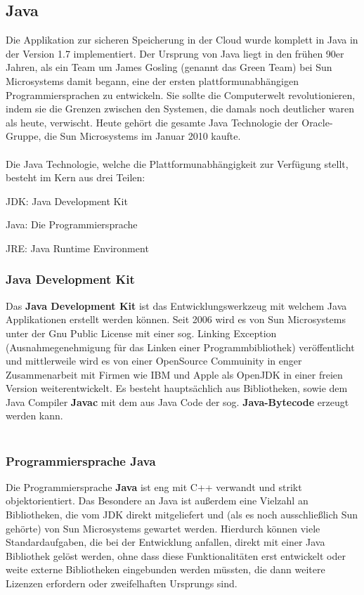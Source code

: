 \documentclass[13pt,a4paper,bibliography=totocnumbered,listof=totocnumbered]{scrartcl}
\begin{document}
\subsection{Java}\label{JavaV}
Die Applikation zur sicheren Speicherung in der Cloud wurde komplett in Java in der Version 1.7 implementiert. Der Ursprung von Java liegt in den frühen 90er Jahren, als ein Team um James Gosling (genannt das Green Team) bei Sun Microsystems damit begann, eine der ersten plattformunabhängigen Programmiersprachen zu entwickeln. Sie sollte die Computerwelt revolutionieren, indem sie die Grenzen zwischen den Systemen, die damals noch deutlicher waren als heute, verwischt. Heute gehört die gesamte Java Technologie der Oracle-Gruppe, die Sun Microsystems im Januar 2010 kaufte.\\
\cite{1}\cite{2}\cite[S. 52]{3}\\

Die Java Technologie, welche die Plattformunabhängigkeit zur Verfügung stellt, besteht im Kern aus drei Teilen:
\begin{compactitem}
	\item JDK: Java Development Kit
	\item Java: Die Programmiersprache
	\item JRE: Java Runtime Environment
\end{compactitem}

\subsubsection{Java Development Kit}
Das \textbf{Java Development Kit} ist das Entwicklungswerkzeug mit welchem Java Applikationen erstellt werden können. Seit 2006 wird es von Sun Microsystems unter der Gnu Public License mit einer sog. Linking Exception (Ausnahmegenehmigung für das Linken einer Programmbibliothek) veröffentlicht und mittlerweile wird es von einer OpenSource Commuinity in enger Zusammenarbeit mit Firmen wie IBM und Apple als OpenJDK in einer freien Version weiterentwickelt. Es besteht hauptsächlich aus Bibliotheken, sowie dem Java Compiler \textbf{Javac} mit dem aus Java Code der sog. \textbf{Java-Bytecode} erzeugt werden kann.\\
\cite[S. 63f]{3}\\

\subsubsection{Programmiersprache Java}
Die Programmiersprache \textbf{Java} ist eng mit C++ verwandt und strikt objektorientiert. Das Besondere an Java ist außerdem eine Vielzahl an Bibliotheken, die vom JDK direkt mitgeliefert und (als es noch ausschließlich Sun gehörte) von Sun Microsystems gewartet werden. Hierdurch können viele Standardaufgaben, die bei der Entwicklung anfallen, direkt mit einer Java Bibliothek gelöst werden, ohne dass diese Funktionalitäten erst entwickelt oder weite externe Bibliotheken eingebunden werden müssten, die dann weitere Lizenzen erfordern oder zweifelhaften Ursprungs sind.\\
\cite[S. 55, 60]{3}
\end{document}
